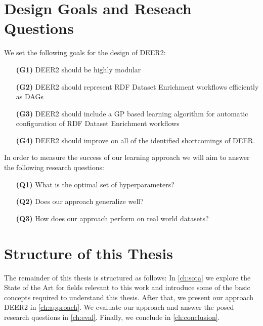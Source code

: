 \section{Design Goals and Reseach Questions}
\label{sec:goals}
We set the following goals for the design of \ac{DEER2}:

\begin{itemize}
  \item[\textbf{(G1)}] \ac{DEER2} should be highly modular
  \item[\textbf{(G2)}] \ac{DEER2} should represent \ac{RDF} Dataset Enrichment workflows efficiently as \acp{DAG}
  \item[\textbf{(G3)}] \ac{DEER2} should include a \ac{GP} based learning algorithm for automatic configuration of \ac{RDF} Dataset Enrichment workflows
  \item[\textbf{(G4)}] \ac{DEER2} should improve on all of the identified shortcomings of \ac{DEER}.
\end{itemize}

\noindent
In order to measure the success of our learning approach we will aim to answer the following research questions:

\begin{itemize}
  \item[\textbf{(Q1)}] What is the optimal set of hyperparameters?
  \item[\textbf{(Q2)}] Does our approach generalize well?
  \item[\textbf{(Q3)}] How does our approach perform on real world datasets?
\end{itemize}

\section{Structure of this Thesis}
\label{sec:structure}
The remainder of this thesis is structured as follows:
In \autoref{ch:sota} we explore the State of the Art for fields relevant to this work and introduce some of the basic concepts required to understand this thesis.
After that, we present our approach \ac{DEER2} in \autoref{ch:approach}.
We evaluate our approach and answer the posed research questions in \autoref{ch:eval}.
Finally, we conclude in \autoref{ch:conclusion}.






